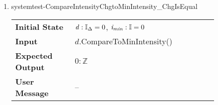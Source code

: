 \begin{enumerate}
    \item{systemtest-CompareIntensityChgtoMinIntensity\_ChgIsEqual}
    \begin{table}[H]
        \centering
        \begin{tabular}{P{0.25\linewidth}P{0.6\linewidth}}
            \toprule
            \textbf{Initial State} & $\mathit{d} : \mathbb{I}_{\Delta} = 0$,
            $\mathit{i_{min}} : \mathbb{I} = 0$ \\
            \textbf{Input} & $\mathit{d}$.CompareToMinIntensity() \\ \midrule
            \textbf{Expected Output} & $0 : \mathbb{Z}$ \\
            \textbf{User Message} & -- \\ \bottomrule
        \end{tabular}
    \end{table}

\end{enumerate}

